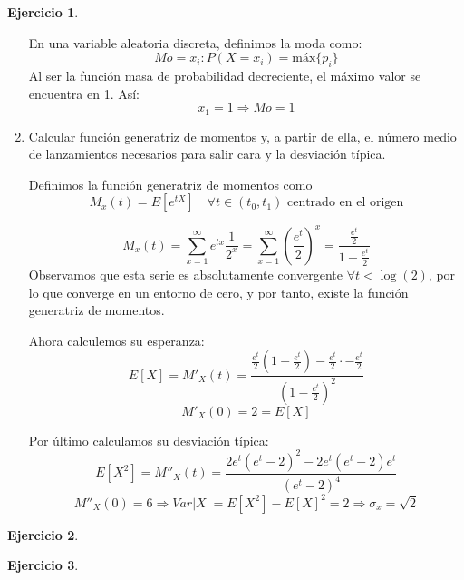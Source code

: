 \documentclass[a4paper, 12pt]{article}
\theoremstyle{definition}
\newtheorem{ej}{Ejercicio}
\begin{document}
\begin{ej}
\begin{enumerate}[label=\textit{\alph*)}]
En una variable aleatoria discreta, definimos la moda como:
\[
	Mo = x_i : P(X=x_i) = \text{máx} \{p_i\}
\]
Al ser la función masa de probabilidad decreciente, el máximo valor se encuentra en 1. Así:
\[
	x_1 = 1 \Rightarrow Mo = 1
\]

	\item Calcular función generatriz de momentos y, a partir de ella, el número medio de lanzamientos necesarios para salir cara y la desviación típica.
	
Definimos la función generatriz de momentos como
\[
M_x(t) = E[e^{tX}] \quad \forall t \in (t_0, t_1) \text{ centrado en el origen}
\]

\[
	M_x(t) = \sum_{x=1}^{\infty} e^{tx} \frac{1}{2^x} = \sum_{x=1}^{\infty} \left( \frac{e^t}{2} \right)^x = \frac{\frac{e^t}{2}}{1- \frac{e^t}{2}}
\]
Observamos que esta serie es absolutamente convergente \(\forall t < \log (2)\), por lo que converge en un entorno de cero, y por tanto, existe la función generatriz de momentos.

Ahora calculemos su esperanza:
\[
	E[X] = M'_X(t) = \frac{\frac{e^t}{2}(1-\frac{e^t}{2}) - \frac{e^t}{2} \cdot - \frac{e^t}{2}}{(1-\frac{e^t}{2})^2}
\]
\[
	M'_X(0) = 2 = E[X]
\]

Por último calculamos su desviación típica:
\[
	E[X^2] = M''_X(t) = \frac{2e^t (e^t -2)^2 - 2e^t (e^t-2)e^t}{(e^t-2)^4}
\]
\[
	M''_X(0) = 6 \Rightarrow Var|X| = E[X^2] - E[X]^2 = 2 \Rightarrow \sigma_x = \sqrt{2}
\]

\end{enumerate}

\end{ej}

\begin{ej}

\end{ej}

\begin{ej}

\end{ej}
\end{document}
